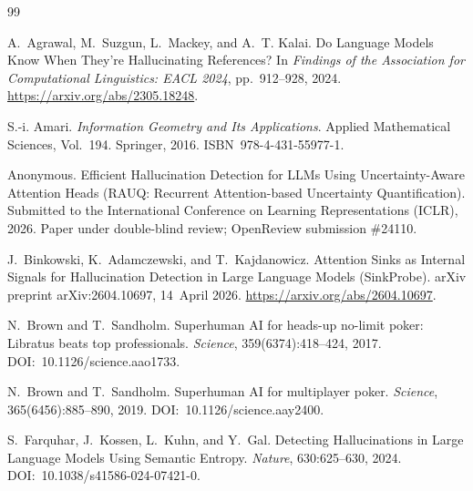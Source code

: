 \documentclass[10pt, letterpaper]{article}
\begin{document}
\begin{thebibliography}{99}

A.~Agrawal, M.~Suzgun, L.~Mackey, and A.~T. Kalai.
\newblock Do Language Models Know When They're Hallucinating
References?
\newblock In \emph{Findings of the Association for Computational
Linguistics: EACL 2024}, pp.~912--928, 2024.
\newblock \url{https://arxiv.org/abs/2305.18248}.

S.-i. Amari.
\newblock \emph{Information Geometry and Its Applications}.
\newblock Applied Mathematical Sciences, Vol.~194. Springer, 2016.
\newblock \mbox{ISBN 978-4-431-55977-1}.

Anonymous.
\newblock Efficient Hallucination Detection for LLMs Using
Uncertainty-Aware Attention Heads (RAUQ: Recurrent
Attention-based Uncertainty Quantification).
\newblock Submitted to the International Conference on Learning
Representations (ICLR), 2026.
\newblock Paper under double-blind review; OpenReview submission
\#24110.

J.~Binkowski, K.~Adamczewski, and T.~Kajdanowicz.
\newblock Attention Sinks as Internal Signals for Hallucination
Detection in Large Language Models (SinkProbe).
\newblock arXiv preprint arXiv:2604.10697, 14~April 2026.
\newblock \url{https://arxiv.org/abs/2604.10697}.

N.~Brown and T.~Sandholm.
\newblock Superhuman AI for heads-up no-limit poker: Libratus beats
top professionals.
\newblock \emph{Science}, 359(6374):418--424, 2017.
\newblock \mbox{DOI: 10.1126/science.aao1733}.

N.~Brown and T.~Sandholm.
\newblock Superhuman AI for multiplayer poker.
\newblock \emph{Science}, 365(6456):885--890, 2019.
\newblock \mbox{DOI: 10.1126/science.aay2400}.

S.~Farquhar, J.~Kossen, L.~Kuhn, and Y.~Gal.
\newblock Detecting Hallucinations in Large Language Models Using
Semantic Entropy.
\newblock \emph{Nature}, 630:625--630, 2024.
\newblock \mbox{DOI: 10.1038/s41586-024-07421-0}.


\end{thebibliography}
\end{document}
